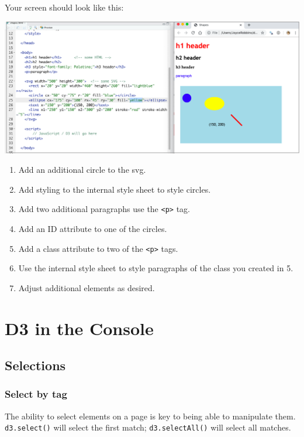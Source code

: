 \documentclass[openany]{book}
\begin{document}
Your screen should look like this:

\begin{center}\includegraphics[width=0.8\linewidth]{images/editor_chrome} \end{center}

\begin{enumerate}
\def\labelenumi{\arabic{enumi}.}
\item
  Add an additional circle to the svg.
\item
  Add styling to the internal style sheet to style circles.
\item
  Add two additional paragraphs use the \texttt{\textless{}p\textgreater{}} tag.
\item
  Add an ID attribute to one of the circles.
\item
  Add a class attribute to two of the \texttt{\textless{}p\textgreater{}} tags.
\item
  Use the internal style sheet to style paragraphs of the class you created in 5.
\item
  Adjust additional elements as desired.
\end{enumerate}

\hypertarget{d3console}{%
\chapter{D3 in the Console }\label{d3console}}

\hypertarget{selections}{%
\section{Selections }\label{selections}}

\hypertarget{select-by-tag}{%
\subsection{Select by tag}\label{select-by-tag}}

The ability to select elements on a page is key to being able to manipulate them. \texttt{d3.select()} will select the first match; \texttt{d3.selectAll()} will select all matches.
\end{document}
